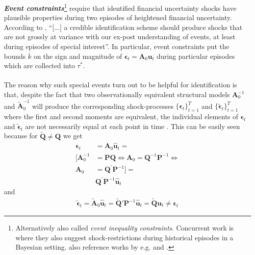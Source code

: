 \documentclass[a4paper,11pt,listof=nochaptergap,oneside,pointednumbers,bibtotoc,bigheadings,liststotoc,hidelinks]{scrbook}
\theoremstyle{mysatz}
\theoremstyle{mydefinition}
\theoremstyle{mytheorem}
\theoremstyle{mybemerkung}
\let\oldhat\hat
\newcommand{\vect}[1]{\boldsymbol{\mathbf{#1}}}
\newcommand{\hatt}[1]{\oldhat{\boldsymbol{\mathbf{#1}}}}
\begin{document}
\textbf{\textit{Event constraints}}\footnote{Alternatively also called \textit{event inequality constraints}. Concurrent work is \citet{diazramirez:18} where they also suggest shock-restrictions during historical episodes in a Bayesian setting. \citet{ludvigsonetal:17} also reference works by e.g. \citet{cieslakschrimpf:19} and \citet{zeev:18}.} require that identified financial uncertainty shocks have plausible properties during two episodes of heightened financial uncertainty. According to \citet[p. 11]{ludvigsonetal:19}, ``[...] a credible identification scheme should produce shocks that are not grossly at variance with our ex-post understanding of events, at least during episodes of special interest''.  In particular, event constraints put the bounds $\overline{k}$ on the sign and magnitude of $\vect{\epsilon}_t = \vect{A}_0\vect{u}_t$ during particular episodes which are collected into $\tau^*$. \\
\\
The reason why such special events turn out to be helpful for identification is that, despite the fact that two observationally equivalent structural models $\vect{A}_0^{-1}$ and $\widetilde{\vect{A}}_0^{-1}$ will produce the corresponding shock-processes $\big\{\vect{\epsilon}_t\big\}_{t=1}^T$ and $\big\{\widetilde{\vect{\epsilon}}_t\big\}_{t=1}^T$ where the first and second moments are equivalent, the individual elements of $\vect{\epsilon}_t$ and $\widetilde{\vect{\epsilon}}_t$ are not necessarily equal at each point in time \citep{ludvigsonetal:18, ludvigsonetal:19}. This can be easily seen because for $\widetilde{\vect{Q}} \neq \vect{Q}$ we get 
\begin{equation} \label{eq:svar_ludvi9}
\begin{split}
\vect{\epsilon}_t & = \vect{A}_0\hatt{\vect{u}}_t = \\
[\vect{A}_0^{-1} & = \vect{P}\vect{Q} \iff \vect{A}_0 = \vect{Q}^{-1}\vect{P}^{-1} \iff \\
\vect{A}_0 & = \vect{Q}^{'}\vect{P}^{-1}] = \\
	& \vect{Q}^'\vect{P}^{-1}\hatt{\vect{u}}_t 
\end{split}								
\end{equation}
and 
\begin{equation} \label{eq:svar_ludvi10}
\begin{split}
\widetilde{\vect{\epsilon}}_t = \widetilde{\vect{A}}_0\hatt{\vect{u}}_t = \widetilde{\vect{Q}}'\vect{P}^{-1}\hatt{\vect{u}}_t = \widetilde{\vect{Q}}\vect{u}_t \neq \vect{\epsilon}_t
\end{split}								
\end{equation}
\end{document}
